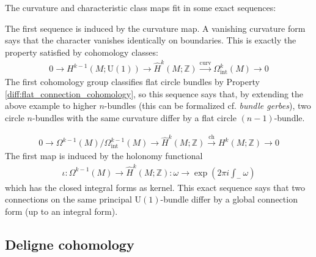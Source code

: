     The curvature and characteristic class maps fit in some exact sequences:
    \begin{property}
        The first sequence is induced by the curvature map. A vanishing curvature form says that the character vanishes identically on boundaries. This is exactly the property satisfied by cohomology classes:
        \begin{gather}
            0\longrightarrow H^{k-1}(M;\mathrm{U}(1))\longrightarrow\hat{H}^k(M;\mathbb{Z})\overset{\mathrm{curv}}{\longrightarrow}\Omega^k_\mathrm{int}(M)\longrightarrow0
        \end{gather}
        The first cohomology group classifies flat circle bundles by Property \ref{diff:flat_connection_cohomology}, so this sequence says that, by extending the above example to higher $n$-bundles (this can be formalized cf. \textit{bundle gerbes}), two circle $n$-bundles with the same curvature differ by a flat circle $(n-1)$-bundle.
    \end{property}
    \begin{property}
        \begin{gather}
            0\longrightarrow \Omega^{k-1}(M)/\Omega^{k-1}_\mathrm{int}(M)\longrightarrow\hat{H}^k(M;\mathbb{Z})\overset{\mathrm{ch}}{\longrightarrow} H^k(M;\mathbb{Z})\longrightarrow0
        \end{gather}
        The first map is induced by the holonomy functional
        \begin{gather}
            \iota:\Omega^{k-1}(M)\rightarrow\hat{H}^k(M;\mathbb{Z}):\omega\rightarrow\exp\left(2\pi i\int_-\omega\right)
        \end{gather}
        which has the closed integral forms as kernel. This exact sequence says that two connections on the same principal $\mathrm{U}(1)$-bundle differ by a global connection form (up to an integral form).
    \end{property}

\subsection{Deligne cohomology}

